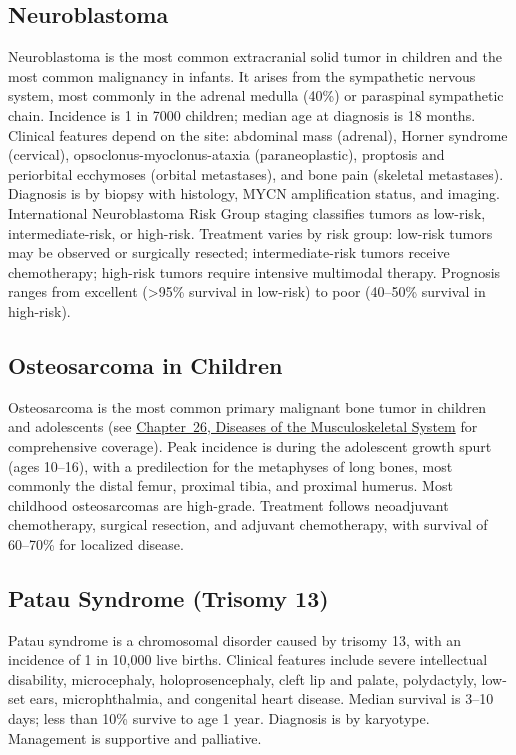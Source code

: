 \subsection{Neuroblastoma}
\label{sec:Neuroblastoma}
Neuroblastoma is the most common extracranial solid tumor in children and the most common malignancy in infants. It arises from the sympathetic nervous system, most commonly in the adrenal medulla (40\%) or paraspinal sympathetic chain. Incidence is 1 in 7000 children; median age at diagnosis is 18 months. Clinical features depend on the site: abdominal mass (adrenal), Horner syndrome (cervical), opsoclonus-myoclonus-ataxia (paraneoplastic), proptosis and periorbital ecchymoses (orbital metastases), and bone pain (skeletal metastases). Diagnosis is by biopsy with histology, MYCN amplification status, and imaging. International Neuroblastoma Risk Group staging classifies tumors as low-risk, intermediate-risk, or high-risk. Treatment varies by risk group: low-risk tumors may be observed or surgically resected; intermediate-risk tumors receive chemotherapy; high-risk tumors require intensive multimodal therapy. Prognosis ranges from excellent (>95\% survival in low-risk) to poor (40--50\% survival in high-risk).

\subsection{Osteosarcoma in Children}
\label{sec:Osteosarcoma in Children}
Osteosarcoma is the most common primary malignant bone tumor in children and adolescents (see \hyperref[ch:bones]{Chapter~26, Diseases of the Musculoskeletal System} for comprehensive coverage). Peak incidence is during the adolescent growth spurt (ages 10--16), with a predilection for the metaphyses of long bones, most commonly the distal femur, proximal tibia, and proximal humerus. Most childhood osteosarcomas are high-grade. Treatment follows neoadjuvant chemotherapy, surgical resection, and adjuvant chemotherapy, with survival of 60--70\% for localized disease.

\subsection{Patau Syndrome (Trisomy 13)}
\label{sec:Patau Syndrome}
Patau syndrome is a chromosomal disorder caused by trisomy 13, with an incidence of 1 in 10,000 live births. Clinical features include severe intellectual disability, microcephaly, holoprosencephaly, cleft lip and palate, polydactyly, low-set ears, microphthalmia, and congenital heart disease. Median survival is 3--10 days; less than 10\% survive to age 1 year. Diagnosis is by karyotype. Management is supportive and palliative.

